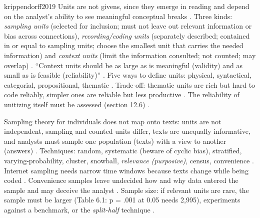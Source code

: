 \begin{papercard}{krippendorff2019}
 Units are not givens, since they emerge in reading and depend on the analyst's ability to see meaningful conceptual breaks . Three kinds: \emph{sampling units} (selected for inclusion; must not leave out relevant information or bias across connections), \emph{recording/coding units} (separately described; contained in or equal to sampling units; choose the smallest unit that carries the needed information) and \emph{context units} (limit the information consulted; not counted; may overlap) . ``Context units should be as large as is meaningful (validity) and as small as is feasible (reliability)'' . Five ways to define units: physical, syntactical, categorial, propositional, thematic . Trade-off: thematic units are rich but hard to code reliably, simpler ones are reliable but less productive . The reliability of unitizing itself must be assessed (section 12.6) .

 Sampling theory for individuals does not map onto texts: units are not independent, sampling and counted units differ, texts are unequally informative, and analysts must sample one population (texts) with a view to another (answers) . Techniques: random, systematic (beware of cyclic bias), stratified, varying-probability, cluster, snowball, \emph{relevance (purposive)}, census, convenience . Internet sampling needs narrow time windows because texts change while being coded . Convenience samples leave undecided how and why data entered the sample and may deceive the analyst . Sample size: if relevant units are rare, the sample must be larger (Table 6.1: p = .001 at 0.05 needs 2,995), experiments against a benchmark, or the \emph{split-half} technique .


\end{papercard}
